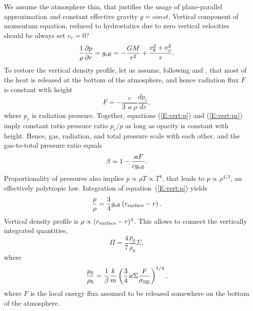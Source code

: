 \documentclass[usenatbib,onecolumn]{mnras}
\newcommand{\alert}[1]{\color{red} #1\color{black}}
\newcommand{\pardir}[2]{\ensuremath{\frac{\partial #2}{\partial #1} }}
\begin{document}
We assume the atmosphere thin, that justifies the usage of plane-parallel
approximation and constant effective gravity $g=const$. Vertical component of
momentum equation, reduced to hydrostatics due to zero vertical velocities
\alert{should be always set $v_r=0$?}
\begin{equation}\label{E:vert:p}
\frac{1}{\rho}\pardir{r}{p}
=g_{\rm eff} = -\frac{GM}{r^2} + \frac{v_\theta^2+v_\varphi^2}{r}.
\end{equation}
To restore the vertical density profile, let us assume, following \citet{IS99}
and \citet{VP06}, that most of the heat is released at the bottom of the
atmosphere, and hence radiation flux $F$ is constant with height
\begin{equation}\label{E:vert:pr}
F = - \frac{c}{3\varkappa \rho} \frac{dp_r}{dr},
\end{equation}
where $p_r$ is radiation pressure.
Together, equations (\ref{E:vert:p}) and (\ref{E:vert:pr}) imply constant
ratio pressure ratio $p_r / p$ as long as opacity is constant with height. 
Hence, gas, radiation, and total pressure scale with each other, and the gas-to-total
pressure ratio equals
\begin{equation}\label{E:vert:beta}
\beta = 1- \frac{\varkappa F }{cg_{\rm eff}}.
\end{equation}
Proportionality of pressures also implies $p \propto \rho T \propto T^4$, that
leads to $p\propto \rho^{4/3}$, an effectively polytropic law. Integration of
equation~(\ref{E:vert:p}) yields
\begin{equation}\label{E:vert:prho}
\frac{p}{\rho} = \frac{3}{4} g_{\rm eff} \left( r_{\rm surface} - r \right).
\end{equation}
Vertical density profile is $\rho \propto (r_{\rm surface} - r)^{3}$. This
allows to connect the vertically integrated quantities,
\begin{equation}\label{E:vert:pisigma}
\Pi = \frac{4}{7} \frac{p_0}{\rho_0} \Sigma,
\end{equation}
where
\begin{equation}\label{E:vert:p0rho0}
\frac{p_0}{\rho_0} = \frac{1}{\beta} \frac{k}{m} \left(\frac{3}{4}\varkappa
\Sigma \frac{F}{\sigma_{\rm SB}} \right)^{1/4},
\end{equation}
where $F$ is the local energy flux assumed to be released somewhere on the
bottom of the atmosphere.
\end{document}
